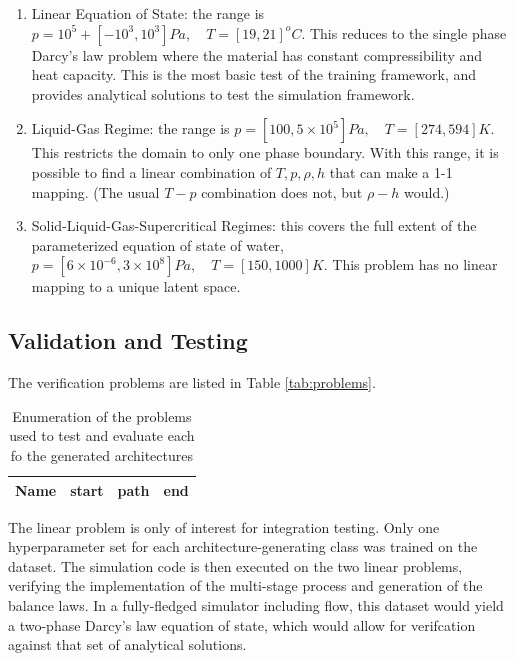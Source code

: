 \documentclass[AMA,STIX1COL]{WileyNJD-v2}
\begin{document}
\begin{enumerate}
\def\labelenumi{\arabic{enumi}.}
\item Linear Equation of State: the range is $ p = 10^5+[-10^3, 10^3]
  Pa,\quad T = [ 19, 21 ] ^o C$. This reduces to the single phase
  Darcy's law problem where the material has constant compressibility
  and heat capacity. This is the most basic test of the training
  framework, and provides analytical solutions to test the simulation
  framework.
\item Liquid-Gas Regime: the range is  $ p = [100,5\times 10^5] Pa,
  \quad T = [274,594] K$. This restricts the domain to only one phase
  boundary. With this range, it is possible to find a linear
  combination of $T,p,\rho,h$ that can make a 1-1 mapping. (The usual
  $T-p$ combination does not, but $\rho-h$ would.)
\item Solid-Liquid-Gas-Supercritical Regimes: this covers the full
  extent of the parameterized equation of state of water,
    $ p = [6\times 10^{-6},3\times 10^8]Pa, \quad T = [150,1000] K
    $. This problem has no linear mapping to a unique latent space.
\end{enumerate}


\hypertarget{header-n3418}{%
\subsection{Validation and Testing}\label{header-n3418}}

The verification problems are listed in Table \ref{tab:problems}.
\begin{table}
  \caption{\label{tag:problems}Enumeration of the problems used to test and evaluate each fo the generated architectures}
\begin{tabular}{l|c|c|c}
  Name & start & path & end\\
\hline
\end{tabular}
\end{table}


The linear problem is only of interest for integration testing. Only one
hyperparameter set for each architecture-generating class was trained
on the dataset. The simulation code is then executed on the two linear
problems, verifying the implementation of the multi-stage process and
generation of the balance laws. In a fully-fledged simulator including flow, this
dataset would yield a two-phase Darcy's law equation of state, which
would allow for verifcation against that set of analytical solutions.
\end{document}
